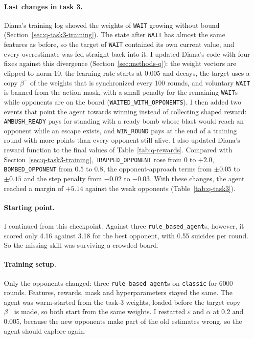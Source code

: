 \documentclass[11pt]{article}
\newcommand{\code}[1]{\texttt{#1}}
\begin{document}
\paragraph{Last changes in task 3.} Diana's training log showed the weights of
\code{WAIT} growing without bound (Section~\ref{sec:q-task3-training}). The state after
\code{WAIT} has almost the same features as before, so the target of \code{WAIT} contained
its own current value, and every overestimate was fed straight back into it. I updated
Diana's code with four fixes against this divergence (Section~\ref{sec:methods-q}): the
weight vectors are clipped to norm 10, the learning rate starts at $0.005$ and decays, the
target uses a copy $\beta^-$ of the weights that is synchronized every 100 rounds, and
voluntary \code{WAIT} is banned from the action mask, with a small penalty for the
remaining \code{WAIT}s while opponents are on the board (\code{WAITED\_WITH\_OPPONENTS}).
I then added two events that point the agent towards winning instead of collecting shaped
reward: \code{AMBUSH\_READY} pays for standing with a ready bomb whose blast would reach an
opponent while an escape exists, and \code{WIN\_ROUND} pays at the end of a training round
with more points than every opponent still alive. I also updated Diana's reward function
to the final values of Table~\ref{tab:q-rewards}. Compared with
Section~\ref{sec:q-task3-training}, \code{TRAPPED\_OPPONENT} rose from 0 to $+2.0$,
\code{BOMBED\_OPPONENT} from $0.5$ to $0.8$, the opponent-approach terms from $\pm 0.05$ to
$\pm 0.15$ and the step penalty from $-0.02$ to $-0.03$. With these changes, the agent
reached a margin of $+5.14$ against the weak opponents (Table~\ref{tab:q-task3}).
 
\paragraph{Starting point.} I continued from this checkpoint. Against three
\code{rule\_based\_agent}s, however, it scored only 4.16 against 3.18 for the best
opponent, with 0.55 suicides per round. So the missing skill was surviving a crowded board.
 
\paragraph{Training setup.} Only the opponents changed: three \code{rule\_based\_agent}s
on \code{classic} for 6000 rounds. Features, rewards, mask and hyperparameters stayed the
same. The agent was warm-started from the task-3 weights, loaded before the target copy
$\beta^-$ is made, so both start from the same weights. I restarted $\varepsilon$ and
$\alpha$ at 0.2 and 0.005, because the new opponents make part of the old estimates
wrong, so the agent should explore again.
 
\end{document}
